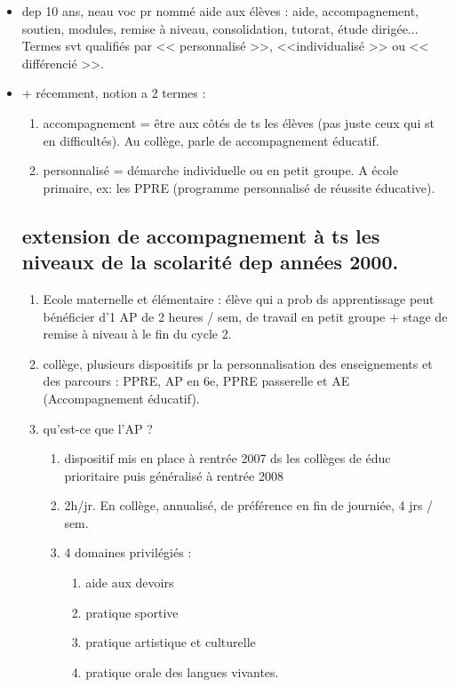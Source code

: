 \documentclass[12pt]{report}
\begin{document}
\begin{itemize}
\begin{itemize}
\item dep 10 ans, neau voc pr nommé aide aux élèves : aide, accompagnement, soutien, modules, remise à niveau, consolidation, tutorat, étude dirigée... Termes svt qualifiés par << personnalisé >>, <<individualisé >> ou << différencié >>.\\
\item + récemment, notion a 2 termes : 
\begin{enumerate}
 \item accompagnement = être aux côtés de ts les élèves (pas juste ceux qui st en difficultés). Au collège, parle de accompagnement éducatif.\\
 \item personnalisé = démarche individuelle ou en petit groupe. A école primaire, ex: les PPRE (programme personnalisé de réussite éducative).\\
\end{enumerate}

\subsection{extension de accompagnement à ts les niveaux de la scolarité dep années 2000.}
\begin{enumerate}
\item Ecole maternelle et élémentaire :  élève qui a prob ds apprentissage peut bénéficier d'1 AP de 2 heures / sem, de travail en petit groupe + stage de remise à niveau à le fin du cycle 2.\\
\item collège, plusieurs dispositifs pr la personnalisation des enseignements et des parcours : PPRE, AP en 6e, PPRE passerelle et AE (Accompagnement éducatif). \\

\item qu'est-ce que l'AP ? \\

\begin{enumerate}
\item dispositif mis en place à rentrée 2007 ds les collèges de éduc prioritaire puis généralisé à rentrée 2008 \\

\item 2h/jr. En collège, annualisé, de préférence en fin de journiée, 4 jrs / sem. \\

\item 4 domaines privilégiés : 
\begin{enumerate}
\item aide aux devoirs
\item  pratique sportive
\item pratique artistique et culturelle
\item  pratique orale des langues vivantes.
\end{enumerate}
\end{enumerate}
\end{enumerate}
\end{itemize}


\end{itemize}
\end{document}
